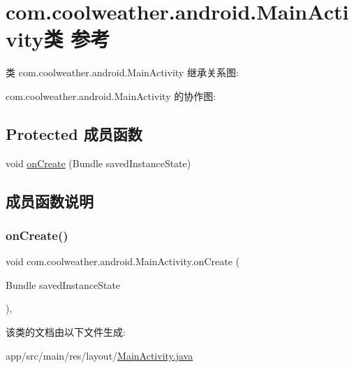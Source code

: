 \hypertarget{classcom_1_1coolweather_1_1android_1_1_main_activity}{}\section{com.\+coolweather.\+android.\+Main\+Activity类 参考}
\label{classcom_1_1coolweather_1_1android_1_1_main_activity}


类 com.\+coolweather.\+android.\+Main\+Activity 继承关系图\+:


com.\+coolweather.\+android.\+Main\+Activity 的协作图\+:
\subsection*{Protected 成员函数}
\begin{DoxyCompactItemize}
\item 
void \mbox{\hyperlink{classcom_1_1coolweather_1_1android_1_1_main_activity_a5fee19dc2cb682fc7af2f4bd5f3b2a3c}{on\+Create}} (Bundle saved\+Instance\+State)
\end{DoxyCompactItemize}


\subsection{成员函数说明}
\mbox{\label{classcom_1_1coolweather_1_1android_1_1_main_activity_a5fee19dc2cb682fc7af2f4bd5f3b2a3c}} 
\subsubsection{\texorpdfstring{onCreate()}{onCreate()}}
{\footnotesize\ttfamily void com.\+coolweather.\+android.\+Main\+Activity.\+on\+Create (\begin{DoxyParamCaption}\item[{Bundle}]{saved\+Instance\+State }\end{DoxyParamCaption})\hspace{0.3cm}{\ttfamily [inline]}, {\ttfamily [protected]}}



该类的文档由以下文件生成\+:\begin{DoxyCompactItemize}
\item 
app/src/main/res/layout/\mbox{\hyperlink{res_2layout_2_main_activity_8java}{Main\+Activity.\+java}}\end{DoxyCompactItemize}

